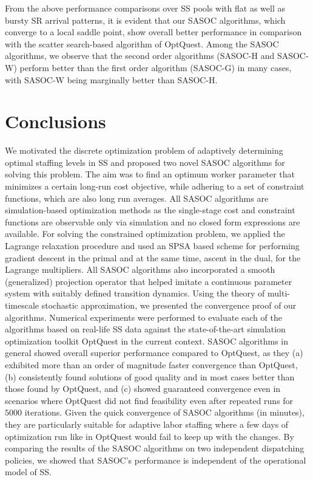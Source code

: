 \documentclass[11pt,letterpaper,english]{article}
\begin{document}
From the above performance comparisons over SS pools with flat as well as bursty SR arrival patterns,
it is evident that our SASOC
algorithms, which converge to a local saddle point, show overall better performance in comparison with the scatter search-based algorithm of OptQuest. Among the SASOC algorithms, we observe that the second order algorithms (SASOC-H and SASOC-W) perform
better than the first order algorithm (SASOC-G) in many cases, with
SASOC-W being marginally better than SASOC-H.

\section{Conclusions}
\label{sec:conclusion}
We motivated the discrete optimization problem of adaptively determining optimal staffing
levels in SS and proposed two novel SASOC algorithms for
solving this problem.  The aim was to find an optimum
worker parameter that minimizes a certain long-run cost objective, while
adhering to a set of constraint functions, which are also long run averages.
All SASOC algorithms are simulation-based optimization methods as the
single-stage cost and constraint functions are observable only via simulation
and no closed form expressions are available.
For solving
the constrained optimization problem, we applied the Lagrange
relaxation procedure and used an SPSA based scheme for performing
gradient descent in the primal and at the same time, ascent in the
dual, for the Lagrange multipliers. All SASOC algorithms also incorporated a smooth (generalized) projection operator that helped imitate a continuous parameter system with suitably defined transition dynamics. Using the theory of
multi-timescale stochastic approximation, we presented the convergence
proof of our algorithms.  Numerical experiments were performed to
evaluate each of the algorithms based on real-life SS data against the
state-of-the-art simulation optimization toolkit OptQuest in the
current context.  SASOC algorithms in general showed overall superior performance
compared to OptQuest, as they (a) exhibited more than an order of
magnitude faster convergence than OptQuest, (b) consistently found
solutions of good quality and in most cases better than those found by
OptQuest, and (c) showed guaranteed convergence even in scenarios
where OptQuest did not find feasibility even after repeated runs for $5000$ iterations.
Given the quick convergence of SASOC algorithms (in minutes), they are
particularly suitable for adaptive labor staffing where a few days of
optimization run like in OptQuest would fail to keep up with the
changes.  By comparing the results of the SASOC algorithms on two
independent dispatching policies, we showed that SASOC's performance
is independent of the operational model of SS.
\end{document}
